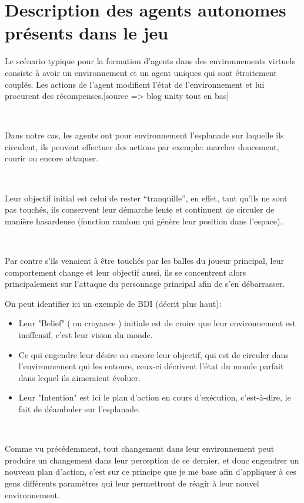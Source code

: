 \section{Description des agents autonomes présents dans le jeu}

Le scénario typique pour la formation d’agents dans des environnements virtuels consiste à avoir un environnement et un agent uniques qui sont étroitement couplés. Les actions de l'agent modifient l'état de l'environnement et lui procurent des récompenses.[source => blog unity tout en bas]

~\par
Dans notre cas, les agents ont pour environnement l’esplanade sur laquelle ils circulent, ils peuvent effectuer des actions par exemple:  marcher doucement, courir ou encore attaquer.
 
 
~\par 
Leur objectif initial est celui de rester “tranquille”, en effet, tant qu’ils ne sont pas touchés, ils conservent leur démarche lente et continuent de circuler de manière hasardeuse (fonction random qui génère leur position dans l’espace).

~\par
Par contre s'ils venaient à être touchés par les balles du joueur principal, leur comportement change et leur objectif aussi, ils se concentrent alors principalement sur l’attaque du personnage principal afin de s’en débarrasser.

On peut identifier ici un exemple de BDI (décrit plus haut): 

\begin{itemize}
\item Leur "Belief" ( ou croyance ) initiale est de croire que leur environnement est inoffensif, c’est leur vision du monde.
\item Ce qui engendre leur désire ou encore leur objectif, qui est de circuler dans l’environnement qui les entoure, ceux-ci décrivent l'état du monde parfait dans lequel ils aimeraient évoluer.
\item Leur "Intention" est ici le plan d’action en cours d'exécution, c’est-à-dire, le fait de déambuler sur l’esplanade.
\end{itemize}


~\par
Comme vu précédemment, tout changement dans leur environnement peut produire un changement dans leur perception de ce dernier, et donc engendrer un nouveau plan d’action, c’est sur ce principe que je me base afin d’appliquer à ces gens différents paramètres qui leur permettront de réagir à leur nouvel environnement. 

